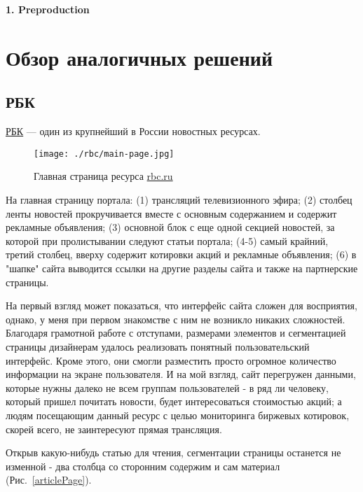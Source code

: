 \newpage
\begin{center}
    \textbf{\large 1. Preproduction}
\end{center}


\section{Обзор аналогичных решений}

\subsection{РБК}

\href{https://rbc.ru/}{РБК} --- один из крупнейший в России новостных ресурсах.

\begin{figure}[!ht]
    \centering
      \texttt{[image: ./rbc/main-page.jpg]}
      \caption{Главная страница ресурса \href{https://rbc.ru/}{rbc.ru}}
    \label{mainPage}
\end{figure}

На главная страницу портала: (1) трансляций телевизионного эфира; (2) столбец ленты новостей прокручивается вместе с основным содержанием и содержит рекламные объявления; (3) основной блок с еще одной секцией новостей, за которой при пролистывании следуют статьи портала; (4-5) самый крайний, третий столбец, вверху содержит котировки акций и рекламные объявления; (6) в "шапке" сайта выводится ссылки на другие разделы сайта и также на партнерские страницы.

На первый взгляд может показаться, что интерфейс сайта сложен для восприятия, однако, у меня при первом знакомстве с ним не возникло никаких сложностей. Благодаря грамотной работе с отступами, размерами элементов и сегментацией страницы дизайнерам удалось реализовать понятный пользовательский интерфейс. Кроме этого, они смогли разместить просто огромное количество информации на экране пользователя. И на мой взгляд, сайт перегружен данными, которые нужны далеко не всем группам пользователей - в ряд ли человеку, который пришел почитать новости, будет интересоваться стоимостью акций; а людям посещающим данный ресурс с целью мониторинга биржевых котировок, скорей всего, не заинтересуют прямая трансляция.

Открыв какую-нибудь статью для чтения, сегментации страницы останется не изменной - два столбца со сторонним содержим и сам материал (Рис.~\ref{articlePage}).

